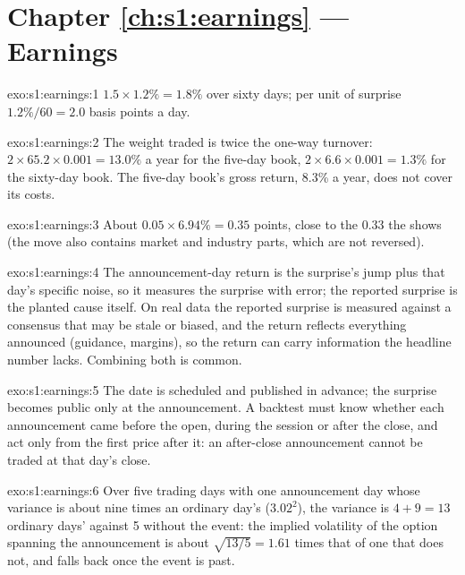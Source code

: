 \section*{Chapter \ref{ch:s1:earnings} --- Earnings}

\begin{solution}{exo:s1:earnings:1}
$1.5 \times 1.2\% = 1.8\%$ over sixty days; per unit of surprise $1.2\%/60 = 2.0$ basis points a day.
\end{solution}

\begin{solution}{exo:s1:earnings:2}
The weight traded is twice the one-way turnover: $2 \times 65.2 \times 0.001 = 13.0\%$ a year for the five-day book, $2 \times 6.6 \times 0.001 = 1.3\%$ for
the sixty-day book. The five-day book's gross return, 8.3\% a year, does not cover its costs.
\end{solution}

\begin{solution}{exo:s1:earnings:3}
About $0.05 \times 6.94\% = 0.35$ points, close to the 0.33 the  shows (the move also contains market and industry parts, which are not reversed).
\end{solution}

\begin{solution}{exo:s1:earnings:4}
The announcement-day return is the surprise's jump plus that day's specific noise, so it measures the surprise with error; the reported surprise is the
planted cause itself. On real data the reported surprise is measured against a consensus that may be stale or biased, and the return reflects everything
announced (guidance, margins), so the return can carry information the headline number lacks. Combining both is common.
\end{solution}

\begin{solution}{exo:s1:earnings:5}
The date is scheduled and published in advance; the surprise becomes public only at the announcement. A backtest must know whether each announcement came
before the open, during the session or after the close, and act only from the first price after it: an after-close announcement cannot be traded at that
day's close.
\end{solution}

\begin{solution}{exo:s1:earnings:6}
Over five trading days with one announcement day whose variance is about nine times an ordinary day's ($3.02^2$), the variance is $4 + 9 = 13$ ordinary days'
against 5 without the event: the implied volatility of the option spanning the announcement is about $\sqrt{13/5} = 1.61$ times that of one that does
not, and falls back once the event is past.
\end{solution}

